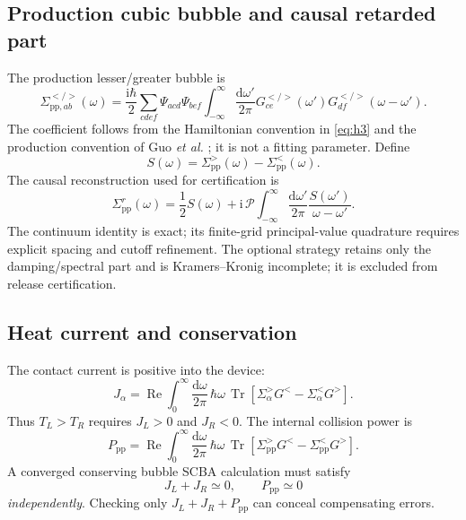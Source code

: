 \documentclass[11pt]{article}
\newcommand{\dd}{\mathrm{d}}
\newcommand{\ii}{\mathrm{i}}
\newcommand{\Tr}{\operatorname{Tr}}
\newcommand{\pp}{\mathrm{pp}}
\newcommand{\code}[1]{\texttt{\detokenize{#1}}}
\renewcommand{\_}{\OriginalTextUnderscore\allowbreak}
\begin{document}
\subsection{Production cubic bubble and causal retarded part}

The production lesser/greater bubble is
\begin{equation}
\Sigma_{\pp,ab}^{</>}(\omega)=
\frac{\ii\hbar}{2}
\sum_{cdef}\Psi_{acd}\Psi_{bef}
\int_{-\infty}^{\infty}\frac{\dd\omega'}{2\pi}
G_{ce}^{</>}(\omega')
G_{df}^{</>}(\omega-\omega').
\label{eq:bubble}
\end{equation}
The coefficient follows from the Hamiltonian convention in
\cref{eq:h3} and the production convention of Guo \emph{et al.}
\cite{guo2020}; it is not a fitting parameter. Define
\begin{equation}
S(\omega)=\Sigma_\pp^>(\omega)-\Sigma_\pp^<(\omega).
\end{equation}
The causal reconstruction used for certification is
\begin{equation}
\Sigma_\pp^r(\omega)=
\frac{1}{2}S(\omega)
+\ii\,\mathcal{P}
\int_{-\infty}^{\infty}\frac{\dd\omega'}{2\pi}
\frac{S(\omega')}{\omega-\omega'}.
\label{eq:hilbert}
\end{equation}
The continuum identity is exact; its finite-grid principal-value quadrature
requires explicit spacing and cutoff refinement. The optional
\code{spectral_only} strategy retains only the damping/spectral part and is
Kramers--Kronig incomplete; it is excluded from release certification.

\subsection{Heat current and conservation}

The contact current is positive into the device:
\begin{equation}
J_\alpha=
\operatorname{Re}\int_0^\infty\frac{\dd\omega}{2\pi}\,
\hbar\omega\,\Tr\left[
\Sigma_\alpha^>G^<-\Sigma_\alpha^<G^>
\right].
\label{eq:current}
\end{equation}
Thus \(T_L>T_R\) requires \(J_L>0\) and \(J_R<0\). The internal collision
power is
\begin{equation}
P_\pp=
\operatorname{Re}\int_0^\infty\frac{\dd\omega}{2\pi}\,
\hbar\omega\,\Tr\left[
\Sigma_\pp^>G^<-\Sigma_\pp^<G^>
\right].
\label{eq:collision}
\end{equation}
A converged conserving bubble SCBA calculation must satisfy
\begin{equation}
J_L+J_R\simeq0,\qquad P_\pp\simeq0
\label{eq:conservation}
\end{equation}
\emph{independently}. Checking only
\(J_L+J_R+P_\pp\) can conceal compensating errors.
\end{document}
